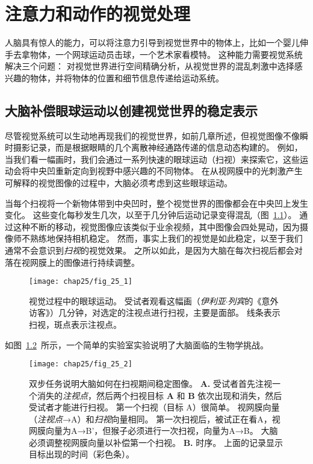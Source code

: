 \chapter{注意力和动作的视觉处理} \label{chap:chap25}

人脑具有惊人的能力，可以将注意力引导到视觉世界中的物体上，比如一个婴儿伸手去拿物体，一个网球运动员击球，一个艺术家看模特。
这种能力需要视觉系统解决三个问题：
对视觉世界进行空间精确分析，从视觉世界的混乱刺激中选择感兴趣的物体，并将物体的位置和细节信息传递给运动系统。



\section{大脑补偿眼球运动以创建视觉世界的稳定表示}

尽管视觉系统可以生动地再现我们的视觉世界，如前几章所述，但视觉图像不像瞬时摄影记录，而是根据眼睛的几个离散神经通路传递的信息动态构建的。
例如，当我们看一幅画时，我们会通过一系列快速的眼球运动（扫视）来探索它，这些运动会将中央凹重新定向到视野中感兴趣的不同物体。
在从视网膜中的光刺激产生可解释的视觉图像的过程中，大脑必须考虑到这些眼球运动。


当每个扫视将一个新物体带到中央凹时，整个视觉世界的图像都会在中央凹上发生变化。
这些变化每秒发生几次，以至于几分钟后运动记录变得混乱（图~\ref{fig:25_1}）。
通过这种不断的移动，视觉图像应该类似于业余视频，其中图像会四处晃动，因为摄像师不熟练地保持相机稳定。
然而，事实上我们的视觉是如此稳定，以至于我们通常不会意识到\textit{扫视}的视觉效果。
之所以如此，是因为大脑在每次扫视后都会对落在视网膜上的图像进行持续调整。


\begin{figure}[htbp]
	\centering
	\texttt{[image: chap25/fig\_25\_1]}
	\caption{视觉过程中的眼球运动。
		受试者观看这幅画（\textit{伊利亚$\cdot$列宾}的《意外访客》）几分钟，对选定的注视点进行扫视，主要是面部。
		线条表示扫视，斑点表示注视点。}
	\label{fig:25_1}
\end{figure}


如图~\ref{fig:25_2}~所示，一个简单的实验室实验说明了大脑面临的生物学挑战。


\begin{figure}[htbp]
	\centering
	\texttt{[image: chap25/fig\_25\_2]}
	\caption{双步任务说明大脑如何在扫视期间稳定图像。
		\textbf{A.} 受试者首先注视一个消失的\textit{注视点}，然后两个扫视目标 \textbf{A} 和 \textbf{B} 依次出现和消失，然后受试者才能进行扫视。
		第一个扫视（目标 A）很简单。
		视网膜向量（\textit{注视点}→A）和\textit{扫视}向量相同。
		第一次扫视后，被试正在看A，视网膜向量为A→B'，但猴子必须进行一次扫视，向量为A→B。
		大脑必须调整视网膜向量以补偿第一个扫视。
		\textbf{B.} 时序。
		上面的记录显示目标出现的时间（彩色条）。}
	\label{fig:25_2}
\end{figure}



